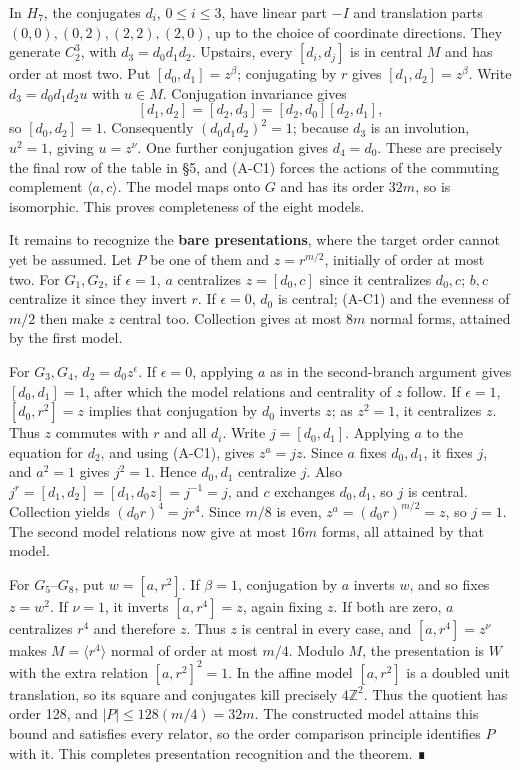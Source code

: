 \documentclass[
  11pt,
  a4paper,
]{article}
\begin{document}
In \(H_7\), the conjugates \(d_i\), \(0\le i\le3\), have linear part
\(-I\) and translation parts \((0,0),(0,2),(2,2),(2,0)\), up to the
choice of coordinate directions. They generate \(C_2^3\), with
\(d_3=d_0d_1d_2\). Upstairs, every \([d_i,d_j]\) is in central \(M\) and
has order at most two. Put \([d_0,d_1]=z^\beta\); conjugating by \(r\)
gives \([d_1,d_2]=z^\beta\). Write \(d_3=d_0d_1d_2u\) with \(u\in M\).
Conjugation invariance gives \[
 [d_1,d_2]=[d_2,d_3]=[d_2,d_0][d_2,d_1],
\] so \([d_0,d_2]=1\). Consequently \((d_0d_1d_2)^2=1\); because \(d_3\)
is an involution, \(u^2=1\), giving \(u=z^\nu\). One further conjugation
gives \(d_4=d_0\). These are precisely the final row of the table in §5,
and (A-C1) forces the actions of the commuting complement
\(\langle a,c\rangle\). The model maps onto \(G\) and has its order
\(32m\), so is isomorphic. This proves completeness of the eight models.

It remains to recognize the \textbf{bare presentations}, where the
target order cannot yet be assumed. Let \(P\) be one of them and
\(z=r^{m/2}\), initially of order at most two. For \(G_1,G_2\), if
\(\epsilon=1\), \(a\) centralizes \(z=[d_0,c]\) since it centralizes
\(d_0,c\); \(b,c\) centralize it since they invert \(r\). If
\(\epsilon=0\), \(d_0\) is central; (A-C1) and the evenness of \(m/2\)
then make \(z\) central too. Collection gives at most \(8m\) normal
forms, attained by the first model.

For \(G_3,G_4\), \(d_2=d_0z^\epsilon\). If \(\epsilon=0\), applying
\(a\) as in the second-branch argument gives \([d_0,d_1]=1\), after
which the model relations and centrality of \(z\) follow. If
\(\epsilon=1\), \([d_0,r^2]=z\) implies that conjugation by \(d_0\)
inverts \(z\); as \(z^2=1\), it centralizes \(z\). Thus \(z\) commutes
with \(r\) and all \(d_i\). Write \(j=[d_0,d_1]\). Applying \(a\) to the
equation for \(d_2\), and using (A-C1), gives \(z^a=jz\). Since \(a\)
fixes \(d_0,d_1\), it fixes \(j\), and \(a^2=1\) gives \(j^2=1\). Hence
\(d_0,d_1\) centralize \(j\). Also
\(j^r=[d_1,d_2]=[d_1,d_0z]=j^{-1}=j\), and \(c\) exchanges \(d_0,d_1\),
so \(j\) is central. Collection yields \((d_0r)^4=j r^4\). Since \(m/8\)
is even, \(z^a=(d_0r)^{m/2}=z\), so \(j=1\). The second model relations
now give at most \(16m\) forms, all attained by that model.

For \(G_5\)--\(G_8\), put \(w=[a,r^2]\). If \(\beta=1\), conjugation by
\(a\) inverts \(w\), and so fixes \(z=w^2\). If \(\nu=1\), it inverts
\([a,r^4]=z\), again fixing \(z\). If both are zero, \(a\) centralizes
\(r^4\) and therefore \(z\). Thus \(z\) is central in every case, and
\([a,r^4]=z^\nu\) makes \(M=\langle r^4\rangle\) normal of order at most
\(m/4\). Modulo \(M\), the presentation is \(W\) with the extra relation
\([a,r^2]^2=1\). In the affine model \([a,r^2]\) is a doubled unit
translation, so its square and conjugates kill precisely
\(4\mathbb Z^2\). Thus the quotient has order 128, and
\(|P|\le128(m/4)=32m\). The constructed model attains this bound and
satisfies every relator, so the order comparison principle identifies
\(P\) with it. This completes presentation recognition and the theorem.
∎
\end{document}
